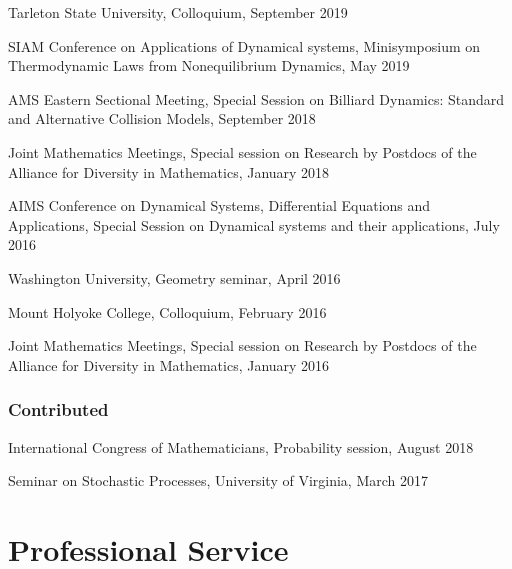\documentclass[10pt,letterpaper]{article}
\renewenvironment{itemize}{
  \begin{list}{}{
    \setlength{\leftmargin}{1.5em}
    \setlength{\itemsep}{0.25em}
    \setlength{\parskip}{0pt}
    \setlength{\parsep}{0.25em}
  }
}{
  \end{list}
}
\begin{document}
\begin{itemize}
\item
  Tarleton State University, Colloquium, September 2019
\item
  SIAM Conference on Applications of Dynamical systems, Minisymposium on
  Thermodynamic Laws from Nonequilibrium Dynamics, May 2019
\item
  AMS Eastern Sectional Meeting, Special Session on Billiard Dynamics:
  Standard and Alternative Collision Models, September 2018
\item
  Joint Mathematics Meetings, Special session on Research by Postdocs of
  the Alliance for Diversity in Mathematics, January 2018
\item
  AIMS Conference on Dynamical Systems, Differential Equations and
  Applications, Special Session on Dynamical systems and their
  applications, July 2016
\item
  Washington University, Geometry seminar, April 2016
\item
  Mount Holyoke College, Colloquium, February 2016
\item
  Joint Mathematics Meetings, Special session on Research by Postdocs of
  the Alliance for Diversity in Mathematics, January 2016
\end{itemize}

\hypertarget{contributed}{%
\subsubsection*{Contributed}\label{contributed}}

\begin{itemize}
\item
  International Congress of Mathematicians, Probability session, August
  2018
\item
  Seminar on Stochastic Processes, University of Virginia, March 2017
\end{itemize}

\hypertarget{professional-service}{%
\section*{Professional Service}\label{professional-service}}
\end{document}

